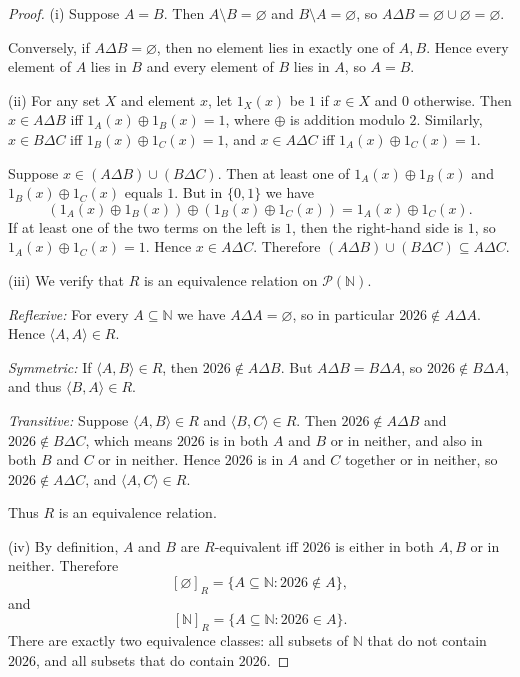 \documentclass[answers,12pt,addpoints]{exam}
\begin{document}
\begin{proof}
(i) Suppose $A = B$. Then $A \setminus B = \varnothing$ and $B \setminus A = \varnothing$,
so $A \Delta B = \varnothing \cup \varnothing = \varnothing$.

Conversely, if $A \Delta B = \varnothing$, then no element lies in exactly one of $A,B$.
Hence every element of $A$ lies in $B$ and every element of $B$ lies in $A$, so $A=B$.

\smallskip

(ii) For any set $X$ and element $x$, let $1_X(x)$ be $1$ if $x \in X$ and $0$ otherwise.
Then $x \in A \Delta B$ iff $1_A(x) \oplus 1_B(x) = 1$, where $\oplus$ is addition modulo $2$.
Similarly, $x \in B \Delta C$ iff $1_B(x) \oplus 1_C(x) = 1$, and
$x \in A \Delta C$ iff $1_A(x) \oplus 1_C(x) = 1$.

Suppose $x \in (A \Delta B) \cup (B \Delta C)$. Then at least one of
$1_A(x) \oplus 1_B(x)$ and $1_B(x) \oplus 1_C(x)$ equals $1$.
But in $\{0,1\}$ we have
\[
(1_A(x) \oplus 1_B(x)) \oplus (1_B(x) \oplus 1_C(x))
= 1_A(x) \oplus 1_C(x).
\]
If at least one of the two terms on the left is $1$, then the right-hand side is $1$,
so $1_A(x) \oplus 1_C(x) = 1$. Hence $x \in A \Delta C$.
Therefore $(A \Delta B) \cup (B \Delta C) \subseteq A \Delta C$.

\smallskip

(iii) We verify that $R$ is an equivalence relation on $\mathcal{P}(\mathbb{N})$.

\emph{Reflexive:} For every $A \subseteq \mathbb{N}$ we have $A \Delta A = \varnothing$,
so in particular $2026 \notin A \Delta A$. Hence $\langle A,A\rangle \in R$.

\emph{Symmetric:} If $\langle A,B\rangle \in R$, then $2026 \notin A \Delta B$.
But $A \Delta B = B \Delta A$, so $2026 \notin B \Delta A$, and thus $\langle B,A\rangle \in R$.

\emph{Transitive:} Suppose $\langle A,B\rangle \in R$ and $\langle B,C\rangle \in R$.
Then $2026 \notin A \Delta B$ and $2026 \notin B \Delta C$, which means
$2026$ is in both $A$ and $B$ or in neither, and also in both $B$ and $C$ or in neither.
Hence $2026$ is in $A$ and $C$ together or in neither, so $2026 \notin A \Delta C$,
and $\langle A,C\rangle \in R$.

Thus $R$ is an equivalence relation.

\smallskip

(iv) By definition, $A$ and $B$ are $R$-equivalent iff $2026$ is either in both
$A,B$ or in neither. Therefore
\[
[\varnothing]_R = \{A \subseteq \mathbb{N} : 2026 \notin A\},
\]
and
\[
[\mathbb{N}]_R = \{A \subseteq \mathbb{N} : 2026 \in A\}.
\]
There are exactly two equivalence classes: all subsets of $\mathbb{N}$ that do not contain
$2026$, and all subsets that do contain $2026$.
\end{proof}
\end{document}
